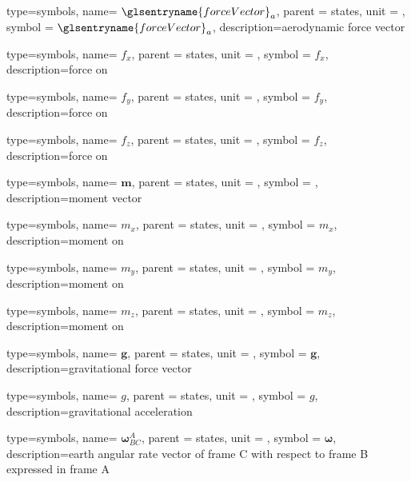 {type=symbols,
	name= \ensuremath{{\glsentryname{forceVector}}_{a}},
	parent = {states},
	unit = \unexpanded{},
	symbol = \ensuremath{{\glsentryname{forceVector}}_{a}},
	description={aerodynamic force vector}
}

{type=symbols,
	name= \ensuremath{f_{x}},
	parent = {states},
	unit = \unexpanded{\si{\newton}},
	symbol = \ensuremath{f_{x}},
	description={force on }
}

{type=symbols,
	name= \ensuremath{f_{y}},
	parent = {states},
	unit = \unexpanded{\si{\newton}},
	symbol = \ensuremath{f_{y}},
	description={force on }
}

{type=symbols,
	name= \ensuremath{f_{z}},
	parent = {states},
	unit = \unexpanded{\si{\newton}},
	symbol = \ensuremath{f_{z}},
	description={force on }
}


{type=symbols,
	name= \ensuremath{\mathbf{m}},
	parent = {states},
	unit = \unexpanded{},
	symbol = ,
	description={moment vector}
}

{type=symbols,
	name= \ensuremath{m_{x}},
	parent = {states},
	unit = \unexpanded{\si{\newton\meter}},
	symbol = \ensuremath{m_{x}},
	description={moment on }
}

{type=symbols,
	name= \ensuremath{m_{y}},
	parent = {states},
	unit = \unexpanded{\si{\newton\meter}},
	symbol = \ensuremath{m_{y}},
	description={moment on }
}

{type=symbols,
	name= \ensuremath{m_{z}},
	parent = {states},
	unit = \unexpanded{\si{\newton\meter}},
	symbol = \ensuremath{m_{z}},
	description={moment on }
}

{type=symbols,
	name= \ensuremath{\mathbf{g}},
	parent = {states},
	unit = \unexpanded{},
	symbol = \ensuremath{\mathbf{g}},
	description={gravitational force vector}
}

{type=symbols,
	name= \ensuremath{g},
	parent = {states},
	unit = \unexpanded{\si{\meter\per\second\squared}},
	symbol = \ensuremath{g},
	description={gravitational acceleration}
}

{type=symbols,
	name= \ensuremath{\boldsymbol{\omega}_{BC}^{A}},
	parent = {states},
	unit = \unexpanded{\si{\radian\per\second}},
	symbol = \ensuremath{\boldsymbol{\omega}},
	description={earth angular rate vector of frame C with respect to frame B expressed in frame A}
}

